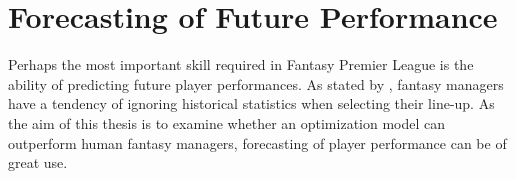 \begin{comment}
There is limited research available on optimization of a Fantasy Premier League team. However, due to the large amount of active NFL Fantasy Sports players, literature is available for both season- and weekly format. \cite{King} suggested a model for predicting points for the quarterbacks in the NFL, using Backward Stepwise regression and Support Vector regression models in his research. Further, he predicted fantasy points by use of Artificial Neural Networks. Similar approaches can be used in order to predict the performance of the Premier League players.
\end{comment}


\section{Forecasting of Future Performance} \label{Forecasting_of_future_performance}
Perhaps the most important skill required in Fantasy Premier League is the ability of predicting future player performances. As stated by \cite{Smith}, fantasy managers have a tendency of ignoring historical statistics when selecting their line-up. As the aim of this thesis is to examine whether an optimization model can outperform human fantasy managers, forecasting of player performance can be of great use. 

